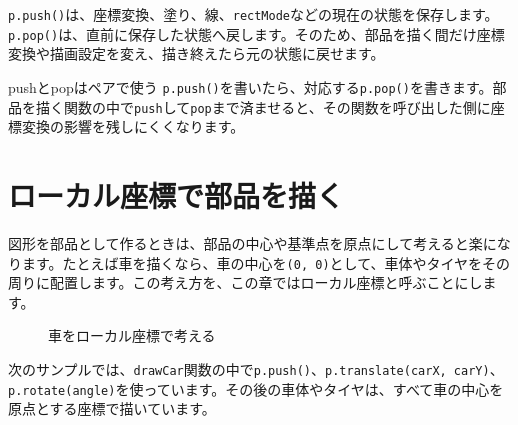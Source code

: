 \texttt{p.push()}は、座標変換、塗り、線、\texttt{rectMode}などの現在の状態を保存します。\texttt{p.pop()}は、直前に保存した状態へ戻します。そのため、部品を描く間だけ座標変換や描画設定を変え、描き終えたら元の状態に戻せます。

\begin{pointbox}{pushとpopはペアで使う}
\texttt{p.push()}を書いたら、対応する\texttt{p.pop()}を書きます。部品を描く関数の中で\texttt{push}して\texttt{pop}まで済ませると、その関数を呼び出した側に座標変換の影響を残しにくくなります。
\end{pointbox}

\section{ローカル座標で部品を描く}

図形を部品として作るときは、部品の中心や基準点を原点にして考えると楽になります。たとえば車を描くなら、車の中心を\texttt{(0, 0)}として、車体やタイヤをその周りに配置します。この考え方を、この章ではローカル座標と呼ぶことにします。

\begin{figure}[htbp]
    \centering
    \caption{車をローカル座標で考える}
    \label{fig:chapter09-local-car}
\end{figure}

次のサンプルでは、\texttt{drawCar}関数の中で\texttt{p.push()}、\texttt{p.translate(carX, carY)}、\texttt{p.rotate(angle)}を使っています。その後の車体やタイヤは、すべて車の中心を原点とする座標で描いています。

\begin{listing}[htbp]
\inputminted{ts}{typescript-p5/listings/chapter09/local-car-function.ts}
\caption{ローカル座標で車を部品として描く（\texttt{chapter09/local-car-function.ts}）}
\label{lst:chapter09-local-car-function}
\end{listing}

